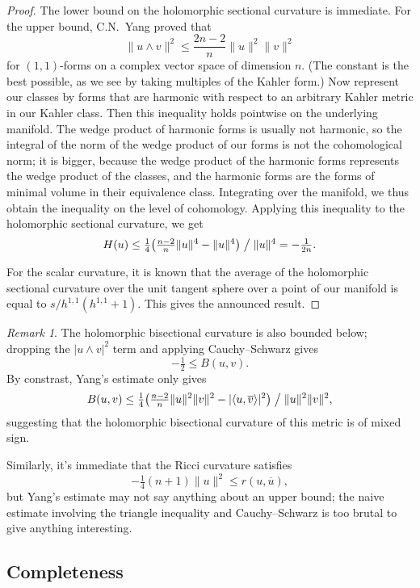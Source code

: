 \documentclass[11pt,a4paper]{amsart}
\theoremstyle{definition}
\theoremstyle{remark}
\newtheorem*{rema}{Remark}
\def\ov#1{\overline{#1}}
\def\ton{u}
\def\ttw{v}
\begin{document}
\begin{proof}
The lower bound on the holomorphic sectional curvature is immediate. For
the upper bound, C.N.~Yang proved that 
$$
\| \ton \wedge \ttw \|^2
\leq \frac{2n-2}{n} \|\ton\|^2 \|\ttw\|^2
$$
for $(1,1)$-forms on a complex vector space of dimension $n$.
(The constant is the best possible, as we see by taking multiples of the
Kahler form.) Now represent our classes by forms that are harmonic with
respect to an arbitrary Kahler metric in our Kahler class. Then this
inequality holds pointwise on the underlying manifold. The wedge product
of harmonic forms is usually not harmonic, so the integral of the
norm of the wedge product of our forms is not the cohomological norm; it
is bigger, because the wedge product of the harmonic forms represents the
wedge product of the classes, and the harmonic forms are the forms of
minimal volume in their equivalence class. Integrating over the
manifold, we thus obtain the inequality on the level of cohomology.
Applying this inequality to the holomorphic sectional curvature, we get
$$
H(\ton) 
\leq 
\tfrac14
\bigl( \tfrac{n-2}{n} \|\ton\|^4 - \|\ton\|^4\bigr) \bigm/ \|u\|^4
= -\tfrac{1}{2n}.
$$

For the scalar curvature, it is known that the average of the
holomorphic sectional curvature over the unit tangent sphere over a
point of our manifold is equal to $s / h^{1,1}(h^{1,1}+1)$. This gives
the announced result.
\end{proof}


\begin{rema}
The holomorphic bisectional curvature is also bounded below;
dropping the $|\ton\wedge\ttw|^2$ term and applying Cauchy--Schwarz
gives
$$
-\tfrac12 \leq B(\ton,\ttw).
$$
By constrast, Yang's estimate only gives
$$
B(\ton,\ttw)
\leq 
\tfrac14
\bigl( \tfrac{n-2}{n} \|\ton\|^2 \|\ttw\|^2 
- |\langle \ton, \ov\ttw\rangle|^2\bigr)
\bigm/ \|\ton\|^2\|\ttw\|^2,
$$
suggesting that the holomorphic bisectional curvature of this metric is
of mixed sign. 

Similarly, it's immediate that the Ricci curvature satisfies
$$
-\tfrac14(n+1)\|\ton\|^2 \leq r(\ton,\ov\ton),
$$
but Yang's estimate may not say anything about an upper bound; the naive
estimate involving the triangle inequality and Cauchy--Schwarz is too
brutal to give anything interesting.
\end{rema}




\subsection*{Completeness}
\end{document}
